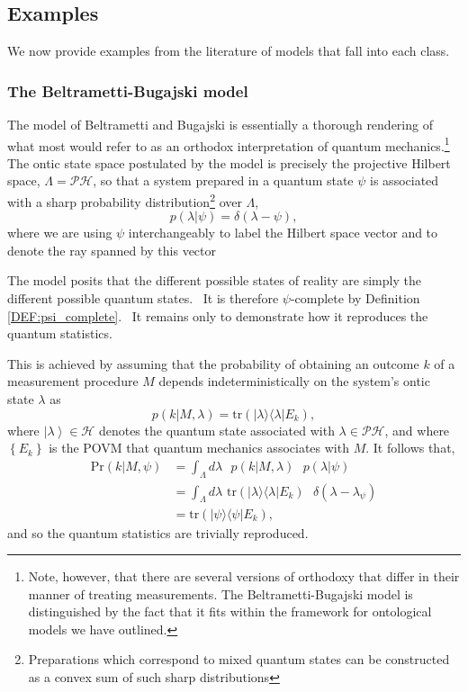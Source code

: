 \documentclass[aps,nofootinbib,12pt]{revtex4}
\begin{document}
\subsection{Examples \label{SEC:example_models}}

We now provide examples from the literature of models that fall into
each class.

\subsubsection{The Beltrametti-Bugajski model \label{SEC:example_bb}}

The model of Beltrametti and Bugajski \cite{beltrametti_bugajski} is
essentially a thorough rendering of what most would refer to as an
orthodox interpretation of quantum mechanics.\footnote{Note,
however, that there are several versions of orthodoxy that differ in
their manner of treating measurements. The Beltrametti-Bugajski
model is distinguished by the fact that it fits within the framework
for ontological models we have outlined.} The ontic state space
postulated by the model is precisely the projective Hilbert space,
$\Lambda=\mathcal{PH}$, so that a system prepared in a quantum state
$\psi$ is associated with a sharp probability
distribution\footnote{Preparations which correspond to mixed quantum
states can be constructed as a convex sum of such sharp
distributions} over $\Lambda$,
\begin{equation}
p\left(  \lambda|\psi\right)  =\delta\left(  \lambda-\psi\right),
\end{equation}
where we are using $\psi$ interchangeably to label the Hilbert space
vector and to denote the ray spanned by this vector

The model posits that the different possible states of reality are
simply the different possible quantum states. \ It is therefore
$\psi$-complete by Definition \ref{DEF:psi_complete}. \ It remains
only to demonstrate how it reproduces the quantum statistics.

This is achieved by assuming that the probability of obtaining an
outcome $k$ of a measurement procedure $M$ depends
indeterministically on the system's ontic state $\lambda$ as
\begin{equation}
p\left(  k|M,\lambda\right)  =\text{tr}\left(  |\lambda\rangle\langle
\lambda|E_{k}\right),\label{BB1}%
\end{equation}
where $\left\vert \lambda\right\rangle \in\mathcal{H}$ denotes the
quantum state associated with $\lambda\in\mathcal{PH}$, and where
$\left\{ E_{k}\right\}$ is the POVM that quantum mechanics
associates with $M$. It follows that,
\begin{align}
\mathrm{Pr}\left(  k|M,\psi\right)   &  =\int_{\Lambda}{d}\lambda\text{ }%
{p}\left(  k|M,\lambda\right)  \text{ }p(\lambda|\psi)\nonumber\\
&  =\int_{\Lambda}{d}\lambda\text{ tr}\left(  |\lambda\rangle\langle
\lambda|E_{k}\right)  \text{ }\delta\left(  \lambda-\lambda_{\psi}\right)
\label{BB2}\\
&  =\text{tr}\left(  |\psi\rangle\langle\psi|E_{k}\right),\label{BB3}%
\end{align}
and so the quantum statistics are trivially reproduced.
\end{document}
